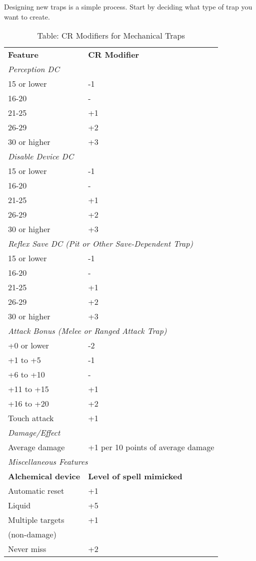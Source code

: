 				
Designing new traps is a simple process. Start by deciding what type of trap you want to create.
\begin{table}[]
\sffamily
\caption{Table: CR Modifiers for Mechanical Traps}
\begin{tabular}{ll}
\textbf{Feature} & \textbf{CR Modifier}\\
\multicolumn{2}{l}{\textit{Perception DC}}\\
15 or lower & -1\\
16-20 & -\\
21-25 & +1\\
26-29 & +2\\
30 or higher & +3\\
\multicolumn{2}{l}{\textit{Disable Device DC}}\\
15 or lower & -1\\
16-20 & -\\
21-25 & +1\\
26-29 & +2\\
30 or higher & +3\\
\multicolumn{2}{l}{\textit{Reflex Save DC (Pit or Other Save-Dependent Trap)}}\\
15 or lower & -1\\
16-20 & -\\
21-25 & +1\\
26-29 & +2\\
30 or higher & +3\\
\multicolumn{2}{l}{\textit{Attack Bonus (Melee or Ranged Attack Trap)}}\\
+0 or lower & -2\\
+1 to +5 & -1\\
+6 to +10 & -\\
+11 to +15 & +1\\
+16 to +20 & +2\\
Touch attack & +1\\
\multicolumn{2}{l}{\textit{Damage/Effect}}\\
Average damage & +1 per 10 points of average damage\\
\multicolumn{2}{l}{\textit{Miscellaneous Features}}\\
\textbf{Alchemical device} & \textbf{Level of spell mimicked}\\
Automatic reset & +1\\
Liquid & +5\\
Multiple targets & +1\\
 (non-damage) &  \\
Never miss & +2\\

\end{tabular}
\end{table}
